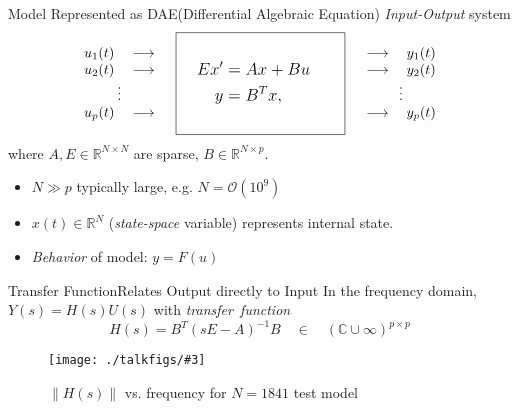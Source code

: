 \documentclass{beamer}
\newcommand{\R}{\mathbb{R}}
\newcommand{\C}{\mathbb{C}}
\newcommand{\nin}{p}  %
\newcommand{\bigO}[1]{\mathcal{O}\left( #1 \right)}
\theoremstyle{remark}
\newcommand{\putfig}[3][{}]{\texttt{[image: ./talkfigs/\#3]}} %
\begin{document}
\begin{frame}{Model Represented as DAE}{(Differential Algebraic Equation)}
   \emph{Input-Output} system
   \begin{equation*}  
   \begin{array}{c}
   u_1(t)\quad\longrightarrow \\ u_2(t)\quad\longrightarrow\\ \vdots\\u_\nin(t)\quad\longrightarrow
   \end{array}
  \quad
  \boxed{\large
 	    \begin{aligned}
 	    \\
 			\quad Ex' &=  Ax + Bu\quad\\
 			y &= B^Tx,\\
 			\\
 		\end{aligned}	
      }
  \quad	
		 \begin{array}{c}
	 \longrightarrow\quad y_1(t)\\ \longrightarrow\quad y_2(t)\\ \vdots\\\longrightarrow\quad y_\nin(t)
   \end{array} 
 \end{equation*}
 where $A,E\in\R^{N\times N}$ are sparse, $B\in\R^{N\times \nin}$.
 
 \begin{itemize}
   \item $N \gg \nin$ typically large, e.g. $N=\bigO{10^{9}}$
   \item $x(t)\in\R^N$ (\emph{state-space} variable) represents internal state.
   \item \emph{Behavior} of model: $y=F(u)$
   \end{itemize}
 \end{frame}



\begin{frame}{Transfer Function}{Relates Output directly to Input}
    In the frequency domain, $Y(s) = H(s)U(s)$ with \emph{transfer~function}
 	 \[
 		H(s) =  B^T(sE-A)^{-1}B \quad\in\quad (\C\cup\infty)^{\nin \times \nin}
 	\]
 	\begin{figure}
	     \centering
	     	\putfig{0.55}{ex1841s1_urm_tfunc.png}
	     	\caption{$\|H(s)\|$ vs. frequency for $N=1841$ test model}
     \end{figure}
 \end{frame}
 
\end{document}
